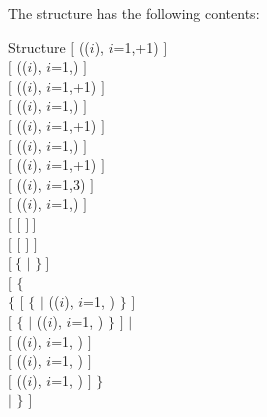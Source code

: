 The  structure has the following contents:
\begin{DataStructure}{Structure }
$[$  (($i$), $i$=1,+1) $]$\\
$[$  (($i$), $i$=1,) $]$\\
$[$   (($i$), $i$=1,+1) $]$\\
$[$  (($i$), $i$=1,) $]$\\
$[$   (($i$), $i$=1,+1) $]$\\
$[$  (($i$), $i$=1,) $]$\\
$[$  (($i$), $i$=1,+1) $]$\\
$[$  (($i$), $i$=1,3) $]$\\
$[$  (($i$), $i$=1,) $]$\\
$[$   $[$  $]~]$\\
$[$   $[$  $]$ $]$\\
$[~\{$   $|$   $\}~]$\\
$[$ $\{$    \\
\hspace{0.75cm} $\{$  $[$  $\{$  $|$ (($i$), $i$=1, ) $\}$ $]$ \\
\hspace{1.0cm} $[$   $\{$  $|$ (($i$), $i$=1, ) $\}$ $]$  $|$ \\
\hspace{1.0cm} $[$  (($i$), $i$=1, )  $]$ \\
\hspace{1.0cm} $[$  (($i$), $i$=1, )  $]$   \\
\hspace{1.0cm} $[$  (($i$), $i$=1, )  $]$   $\}$\\
\hspace{0.3cm}$|$    $\}$ $]$
\end{DataStructure}

